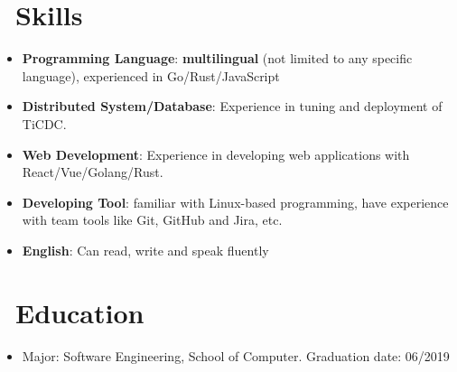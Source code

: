 \documentclass{resume}
\newcommand{\en}[1]{#1}
\newcommand{\zh}[1]{}
\begin{document}
\section{\faCogs\ \en{Skills}\zh{技能}}
\begin{itemize}[parsep=0.25ex]
      \item \en{\textbf{Programming Language}:
                  \textbf{multilingual} (not limited to any specific language),
                  experienced in Go/Rust/JavaScript}
            \zh{\textbf{编程语言}:
                  \textbf{泛语言}（编程不受特定语言限制），
                  熟悉 Go/Rust/JavaScript}

      \item \en{\textbf{Distributed System/Database}:
                  Experience in tuning and deployment of TiCDC.}
            \zh{\textbf{分布式系统/数据库}:
                  有分布式系统 TiCDC 的调优开发以及部署经验。}

      \item \en{\textbf{Web Development}:
                  Experience in developing web applications with React/Vue/Golang/Rust.}
            \zh{\textbf{网站开发}:
                  有使用 React/Vue/Golang/Rust 开发网站应用的经验。}

      \item \en{\textbf{Developing Tool}:
                  familiar with Linux-based programming,
                  have experience with team tools like Git, GitHub and Jira, etc.}
            \zh{\textbf{开发工具}:
                  熟悉 Linux，有 Git、GitHub 和 Jira 等团队协作工具的使用经验}

      \item \en{\textbf{English}:
                  Can read, write and speak fluently}
            \zh{\textbf{英语}:
                  可以熟练的听说读写}
\end{itemize}

\section{\faGraduationCap\ \en{Education}\zh{教育经历}}
\en{}
\zh{\datedsubsection{\textbf{重庆理工大学}, 本科}{2015/09 -- 2019/06}}
\begin{itemize}
      \item \en{Major: Software Engineering, School of Computer. Graduation date: 06/2019}
            \zh{软件工程，计算机学院，2019 年 6 月毕业}
\end{itemize}
\end{document}
